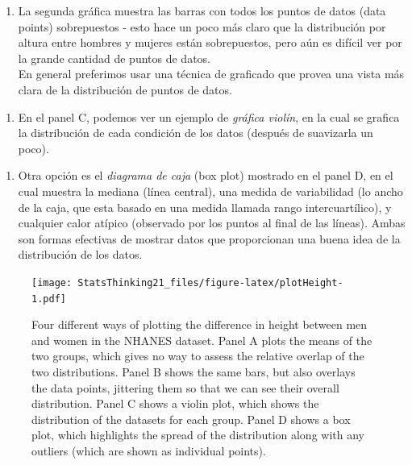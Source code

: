\documentclass[
  12pt,
]{book}
\providecommand{\tightlist}{%
  \setlength{\itemsep}{0pt}\setlength{\parskip}{0pt}}
\theoremstyle{definition}
\theoremstyle{definition}
\theoremstyle{definition}
\theoremstyle{remark}
\begin{document}
\begin{enumerate}
\def\labelenumi{\arabic{enumi}.}
\setcounter{enumi}{1}
\tightlist
\item
  La segunda gráfica muestra las barras con todos los puntos de datos (data points) sobrepuestos - esto hace un poco más claro que la distribución por altura entre hombres y mujeres están sobrepuestos, pero aún es difícil ver por la grande cantidad de puntos de datos.\\
  En general preferimos usar una técnica de graficado que provea una vista más clara de la distribución de puntos de datos.
\end{enumerate}

\begin{enumerate}
\def\labelenumi{\arabic{enumi}.}
\setcounter{enumi}{2}
\tightlist
\item
  En el panel C, podemos ver un ejemplo de \emph{gráfica violín}, en la cual se grafica la distribución de cada condición de los datos (después de suavizarla un poco).
\end{enumerate}

\begin{enumerate}
\def\labelenumi{\arabic{enumi}.}
\setcounter{enumi}{3}
\tightlist
\item
  Otra opción es el \emph{diagrama de caja} (box plot) mostrado en el panel D, en el cual muestra la mediana (línea central), una medida de variabilidad (lo ancho de la caja, que esta basado en una medida llamada rango intercuartílico), y cualquier calor atípico (observado por los puntos al final de las líneas). Ambas son formas efectivas de mostrar datos que proporcionan una buena idea de la distribución de los datos.
\end{enumerate}

\begin{figure}
\centering
\texttt{[image: StatsThinking21\_files/figure-latex/plotHeight-1.pdf]}
\caption{\label{fig:plotHeight}Four different ways of plotting the difference in height between men and women in the NHANES dataset. Panel A plots the means of the two groups, which gives no way to assess the relative overlap of the two distributions. Panel B shows the same bars, but also overlays the data points, jittering them so that we can see their overall distribution. Panel C shows a violin plot, which shows the distribution of the datasets for each group. Panel D shows a box plot, which highlights the spread of the distribution along with any outliers (which are shown as individual points).}
\end{figure}
\end{document}
